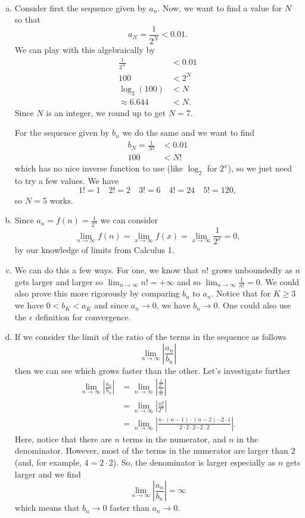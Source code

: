 \documentclass[12pt]{article} %
\begin{document}
\begin{solution}~
\begin{enumerate}[(a)]
    \item Consider first the sequence given by $a_n$.  Now, we want to find a value for $N$ so that
    \[
    a_N=\frac{1}{2^N}<0.01.
    \]
    We can play with this algebraically by
    \begin{align*}
        \frac{1}{2^N}&<0.01\\
        100&< 2^N\\
        \log_2(100)&< N\\
        \approx 6.644&<N.
    \end{align*}
    Since $N$ is an integer, we round up to get $N=7.$
    
    For the sequence given by $b_n$ we do the same and we want to find
    \begin{align*}
        b_N =\frac{1}{N!}&<0.01\\
        100&<N!
    \end{align*}
    which has no nice inverse function to use (like $\log_2$ for $2^x$), so we just need to try a few values.  We have
    \[
    1!=1 \quad 2! = 2 \quad 3! = 6 \quad 4! = 24 \quad 5! = 120,
    \]
    so $N=5$ works.
    \item Since $a_n = f(n)=\frac{1}{2^n}$ we can consider
    \[
    \lim_{n\to \infty} f(n)= \lim_{x\to \infty} f(x) = \lim_{x\to \infty}\frac{1}{2^x} = 0,
    \]
    by our knowledge of limits from Calculus 1.
    \item We can do this a few ways.  For one, we know that $n!$ grows unboundedly as $n$ gets larger and larger so $\lim_{n\to \infty} n! = +\infty$ and so $\lim_{n\to \infty} \frac{1}{n!} = 0$.  We could also prove this more rigorously by comparing $b_n$ to $a_n$.  Notice that for $K\geq 3$ we have $0<b_K<a_K$ and since $a_n\to 0$, we have $b_n\to 0$. One could also use the $\epsilon$ definition for convergence.
    \item If we consider the limit of the ratio of the terms in the sequence as follows
    \[
    \lim_{n\to \infty} \left| \frac{a_n}{b_n}\right|
    \]
    then we can see which grows faster than the other.  Let's investigate further
    \begin{align*}
        \lim_{n\to \infty} \left| \frac{a_n}{b_n}\right| &= \lim_{n\to \infty} \left| \frac{\frac{1}{2^n}}{\frac{1}{n!}}\right|\\
        &= \lim_{n\to \infty} \left| \frac{ n!}{2^n}\right|\\
        &= \lim_{n\to \infty} \left| \frac{ n \cdot (n-1) \cdot (n-2)\cdots 2 \cdot 1}{2\cdot 2 \cdot 2 \cdots 2 \cdot 2}\right|.
    \end{align*}
    Here, notice that there are $n$ terms in the numerator, and $n$ in the denominator.  However, most of the terms in the numerator are larger than $2$ (and, for example, $4=2\cdot 2$).  So, the denominator is larger especially as $n$ gets larger and we find
    \[
    \lim_{n\to \infty} \left| \frac{a_n}{b_n}\right| = \infty
    \]
    which means that $b_n \to 0$ faster than $a_n \to 0$.
\end{enumerate}
\end{solution}
\end{document}
